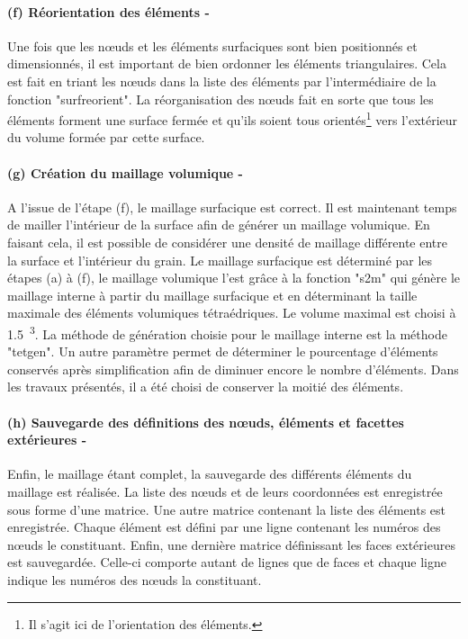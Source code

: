 \paragraph{(f) Réorientation des éléments -}
Une fois que les n\oe{}uds et les éléments surfaciques sont bien positionnés et dimensionnés, il est important de bien ordonner les éléments triangulaires. Cela est fait en triant les n\oe{}uds dans la liste des éléments par l'intermédiaire de la fonction "surfreorient". La réorganisation des n\oe{}uds fait en sorte que tous les éléments forment une surface fermée et qu'ils soient tous orientés\footnote{Il s'agit ici de l'orientation des éléments.} vers l'extérieur du volume formée par cette surface.
\paragraph{(g) Création du maillage volumique -}
A l'issue de l'étape (f), le maillage surfacique est correct. Il est maintenant temps de mailler l'intérieur de la surface afin de générer un maillage volumique. En faisant cela, il est possible de considérer une densité de maillage différente entre la surface et l'intérieur du grain. Le maillage surfacique est déterminé par les étapes (a) à (f), le maillage volumique l'est grâce à la fonction "s2m" qui génère le maillage interne à partir du maillage surfacique et en déterminant la taille maximale des éléments volumiques tétraédriques. Le volume maximal est choisi à \SI{1.5}{\voxel^3}. La méthode de génération choisie pour le maillage interne est la méthode "tetgen". Un autre paramètre permet de déterminer le pourcentage d'éléments conservés après simplification afin de diminuer encore le nombre d'éléments. Dans les travaux présentés, il a été choisi de conserver la moitié des éléments.
\paragraph{(h) Sauvegarde des définitions des n\oe{}uds, éléments et facettes extérieures -}
Enfin, le maillage étant complet, la sauvegarde des différents éléments du maillage est réalisée. La liste des n\oe{}uds et de leurs coordonnées est enregistrée sous forme d'une matrice. Une autre matrice contenant la liste des éléments est enregistrée. Chaque élément est défini par une ligne contenant les numéros des n\oe{}uds le constituant. Enfin, une dernière matrice définissant les faces extérieures est sauvegardée. Celle-ci comporte autant de lignes que de faces et chaque ligne indique les numéros des n\oe{}uds la constituant.
